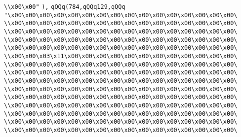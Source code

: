 \verb|\\x00\x00"|\newline
\verb|),|\newline
\verb|qQQq(784,qQQq129,qQQq|\newline
\verb|"\x00\x00\x00\x00\x00\x00\x00\x00\x00\x00\x00\x00\x00\x00\x00\x00\|\newline
\verb|\\x00\x00\x00\x00\x00\x00\x00\x00\x00\x00\x00\x00\x00\x00\x00\x00\|\newline
\verb|\\x00\x00\x00\x00\x00\x00\x00\x00\x00\x00\x00\x00\x00\x00\x00\x00\|\newline
\verb|\\x00\x00\x00\x00\x00\x00\x00\x00\x00\x00\x00\x00\x00\x00\x00\x00\|\newline
\verb|\\x00\x00\x00\x00\x00\x00\x00\x00\x00\x00\x00\x00\x00\x00\x00\x00\|\newline
\verb|\\x00\x00\x03\x11\x00\x00\x00\x00\x00\x00\x00\x00\x00\x00\x00\x00\|\newline
\verb|\\x00\x00\x00\x00\x00\x00\x00\x00\x00\x00\x00\x00\x00\x00\x00\x00\|\newline
\verb|\\x00\x00\x00\x00\x00\x00\x00\x00\x00\x00\x00\x00\x00\x00\x00\x00\|\newline
\verb|\\x00\x00\x00\x00\x00\x00\x00\x00\x00\x00\x00\x00\x00\x00\x00\x00\|\newline
\verb|\\x00\x00\x00\x00\x00\x00\x00\x00\x00\x00\x00\x00\x00\x00\x00\x00\|\newline
\verb|\\x00\x00\x00\x00\x00\x00\x00\x00\x00\x00\x00\x00\x00\x00\x00\x00\|\newline
\verb|\\x00\x00\x00\x00\x00\x00\x00\x00\x00\x00\x00\x00\x00\x00\x00\x00\|\newline
\verb|\\x00\x00\x00\x00\x00\x00\x00\x00\x00\x00\x00\x00\x00\x00\x00\x00\|\newline
\verb|\\x00\x00\x00\x00\x00\x00\x00\x00\x00\x00\x00\x00\x00\x00\x00\x00\|\newline
\verb|\\x00\x00\x00\x00\x00\x00\x00\x00\x00\x00\x00\x00\x00\x00\x00\x00\|\newline

